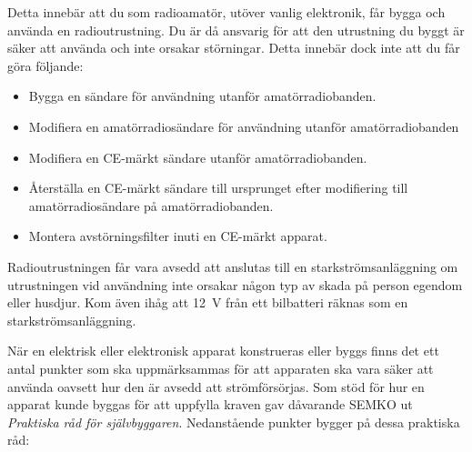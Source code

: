 Detta innebär att du som radioamatör, utöver vanlig elektronik, får bygga
och använda en radioutrustning.
Du är då ansvarig för att den utrustning du byggt är säker att använda och inte
orsakar störningar.
Detta innebär dock inte att du får göra följande:

\begin{itemize}
  \item Bygga en sändare för användning utanför amatörradiobanden.
  \item Modifiera en amatörradiosändare för användning utanför amatörradiobanden
  \item Modifiera en CE-märkt sändare utanför amatörradiobanden.
  \item Återställa en CE-märkt sändare till ursprunget efter modifiering till
    amatörradiosändare på amatörradiobanden.
  \item Montera avstörningsfilter inuti en CE-märkt apparat.
\end{itemize}

Radioutrustningen får vara avsedd att anslutas till en starkströmsanläggning
om utrustningen vid användning inte orsakar någon typ av skada på person
egendom eller husdjur.
Kom även ihåg att \SI{12}{\volt} från ett bilbatteri räknas som en
starkströmsanläggning.

När en elektrisk eller elektronisk apparat konstrueras eller byggs finns det
ett antal punkter som ska uppmärksammas för att apparaten ska vara säker att
använda oavsett hur den är avsedd att strömförsörjas.
Som stöd för hur en apparat kunde byggas för att uppfylla kraven gav
dåvarande SEMKO ut \emph{Praktiska råd för självbyggaren}.
Nedanstående punkter bygger på dessa praktiska råd:

